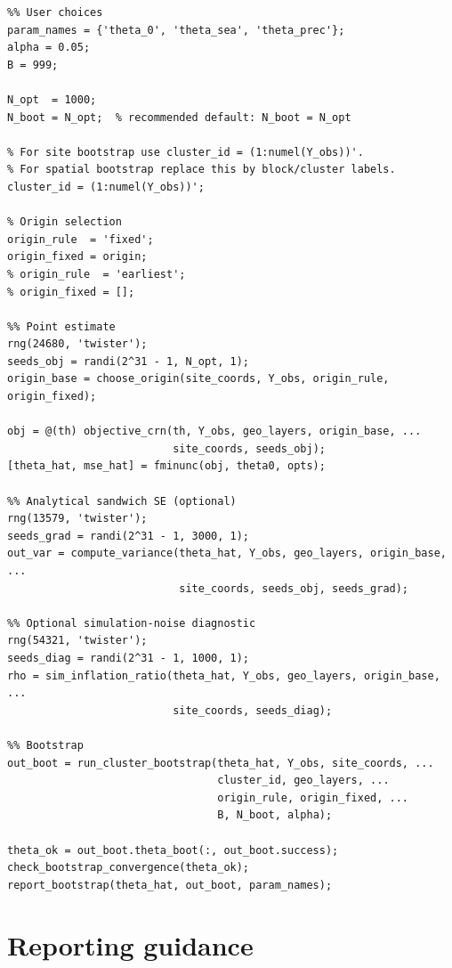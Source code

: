 \documentclass[11pt]{article}
\begin{document}
\begin{lstlisting}
%% User choices
param_names = {'theta_0', 'theta_sea', 'theta_prec'};
alpha = 0.05;
B = 999;

N_opt  = 1000;
N_boot = N_opt;  % recommended default: N_boot = N_opt

% For site bootstrap use cluster_id = (1:numel(Y_obs))'.
% For spatial bootstrap replace this by block/cluster labels.
cluster_id = (1:numel(Y_obs))';

% Origin selection
origin_rule  = 'fixed';
origin_fixed = origin;
% origin_rule  = 'earliest';
% origin_fixed = [];

%% Point estimate
rng(24680, 'twister');
seeds_obj = randi(2^31 - 1, N_opt, 1);
origin_base = choose_origin(site_coords, Y_obs, origin_rule, origin_fixed);

obj = @(th) objective_crn(th, Y_obs, geo_layers, origin_base, ...
                          site_coords, seeds_obj);
[theta_hat, mse_hat] = fminunc(obj, theta0, opts);

%% Analytical sandwich SE (optional)
rng(13579, 'twister');
seeds_grad = randi(2^31 - 1, 3000, 1);
out_var = compute_variance(theta_hat, Y_obs, geo_layers, origin_base, ...
                           site_coords, seeds_obj, seeds_grad);

%% Optional simulation-noise diagnostic
rng(54321, 'twister');
seeds_diag = randi(2^31 - 1, 1000, 1);
rho = sim_inflation_ratio(theta_hat, Y_obs, geo_layers, origin_base, ...
                          site_coords, seeds_diag);

%% Bootstrap
out_boot = run_cluster_bootstrap(theta_hat, Y_obs, site_coords, ...
                                 cluster_id, geo_layers, ...
                                 origin_rule, origin_fixed, ...
                                 B, N_boot, alpha);

theta_ok = out_boot.theta_boot(:, out_boot.success);
check_bootstrap_convergence(theta_ok);
report_bootstrap(theta_hat, out_boot, param_names);
\end{lstlisting}

\section{Reporting guidance}
\end{document}
